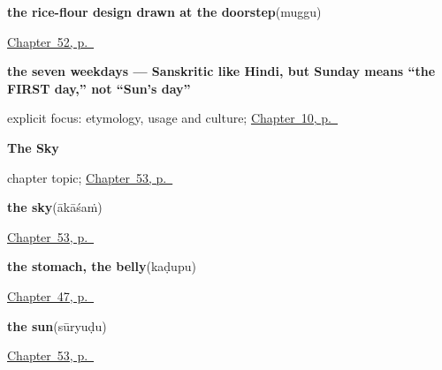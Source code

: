 \noindent\begin{minipage}[t]{\linewidth}
\raggedright
\textbf{the rice-flour design drawn at the doorstep}\enspace\emph{}\enspace(muggu)\par
\footnotesize \hyperref[ch:te-welcome]{Chapter~52, p.~\pageref*{ch:te-welcome}}
\end{minipage}\par\smallskip

\noindent\begin{minipage}[t]{\linewidth}
\raggedright
\textbf{the seven weekdays — Sanskritic like Hindi, but Sunday means \textquotedblleft{}the FIRST day,\textquotedblright{} not \textquotedblleft{}Sun's day\textquotedblright{}}\enspace\emph{      }\par
\footnotesize explicit focus: etymology, usage and culture; \hyperref[ch:te-days-of-the-week]{Chapter~10, p.~\pageref*{ch:te-days-of-the-week}}
\end{minipage}\par\smallskip

\noindent\begin{minipage}[t]{\linewidth}
\raggedright
\textbf{The Sky}\par
\footnotesize chapter topic; \hyperref[ch:te-sky]{Chapter~53, p.~\pageref*{ch:te-sky}}
\end{minipage}\par\smallskip

\noindent\begin{minipage}[t]{\linewidth}
\raggedright
\textbf{the sky}\enspace\emph{}\enspace(ākāśaṁ)\par
\footnotesize \hyperref[ch:te-sky]{Chapter~53, p.~\pageref*{ch:te-sky}}
\end{minipage}\par\smallskip

\noindent\begin{minipage}[t]{\linewidth}
\raggedright
\textbf{the stomach, the belly}\enspace\emph{}\enspace(kaḍupu)\par
\footnotesize \hyperref[ch:te-body-more]{Chapter~47, p.~\pageref*{ch:te-body-more}}
\end{minipage}\par\smallskip

\noindent\begin{minipage}[t]{\linewidth}
\raggedright
\textbf{the sun}\enspace\emph{}\enspace(sūryuḍu)\par
\footnotesize \hyperref[ch:te-sky]{Chapter~53, p.~\pageref*{ch:te-sky}}
\end{minipage}\par\smallskip

